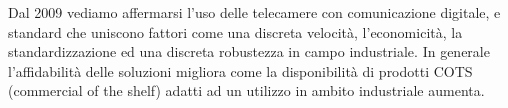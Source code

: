 Dal 2009 vediamo affermarsi l'uso delle telecamere con comunicazione digitale,
e standard che uniscono fattori come una discreta velocità, l'economicità, la
standardizzazione ed una discreta robustezza in campo industriale. In generale
l'affidabilità delle soluzioni migliora come la disponibilità di prodotti COTS
(commercial of the shelf) adatti ad un utilizzo in ambito industriale aumenta.
\endinput
